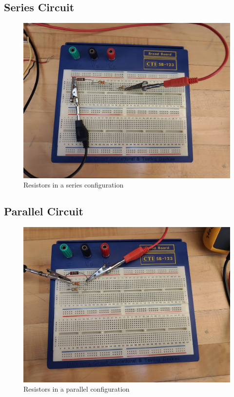 \documentclass[titlepage]{article}
\begin{document}
        \subsection{Series Circuit}

        \begin{figure}[hbt!]
            \centering
            \caption{Resistors in a series configuration}
    \includegraphics[scale=0.2]{procedure/series} 
        \end{figure}

        \FloatBarrier
        \subsection{Parallel Circuit}
        \FloatBarrier

        \begin{figure}[hbt!]
            \centering
            \caption{Resistors in a parallel configuration}
            \includegraphics[scale=0.2]{procedure/parallel} 
        \end{figure}
\end{document}
